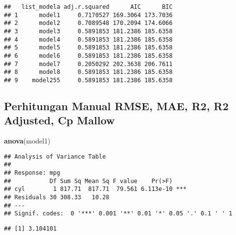 \documentclass[
]{article}
\newenvironment{Shaded}{\begin{snugshade}}{\end{snugshade}}
\newcommand{\DecValTok}[1]{\textcolor[rgb]{0.00,0.00,0.81}{#1}}
\newcommand{\FloatTok}[1]{\textcolor[rgb]{0.00,0.00,0.81}{#1}}
\newcommand{\FunctionTok}[1]{\textcolor[rgb]{0.13,0.29,0.53}{\textbf{#1}}}
\newcommand{\NormalTok}[1]{#1}
\newcommand{\OtherTok}[1]{\textcolor[rgb]{0.56,0.35,0.01}{#1}}
\newcommand{\SpecialCharTok}[1]{\textcolor[rgb]{0.81,0.36,0.00}{\textbf{#1}}}
\begin{document}
\begin{verbatim}
##   list_modela adj.r.squared      AIC      BIC
## 1      model1     0.7170527 169.3064 173.7036
## 2      model2     0.7089548 170.2094 174.6066
## 3      model3     0.5891853 181.2386 185.6358
## 4      model4     0.5891853 181.2386 185.6358
## 5      model5     0.5891853 181.2386 185.6358
## 6      model6     0.5891853 181.2386 185.6358
## 7      model7     0.2050292 202.3638 206.7611
## 8      model8     0.5891853 181.2386 185.6358
## 9    model255     0.5891853 181.2386 185.6358
\end{verbatim}

\subsection{Perhitungan Manual RMSE, MAE, R2, R2 Adjusted, Cp
Mallow}\label{perhitungan-manual-rmse-mae-r2-r2-adjusted-cp-mallow}

\begin{Shaded}
\begin{Highlighting}[]
\FunctionTok{anova}\NormalTok{(model1)}
\end{Highlighting}
\end{Shaded}

\begin{verbatim}
## Analysis of Variance Table
## 
## Response: mpg
##           Df Sum Sq Mean Sq F value    Pr(>F)    
## cyl        1 817.71  817.71  79.561 6.113e-10 ***
## Residuals 30 308.33   10.28                      
## ---
## Signif. codes:  0 '***' 0.001 '**' 0.01 '*' 0.05 '.' 0.1 ' ' 1
\end{verbatim}

\begin{Shaded}
\end{Shaded}

\begin{verbatim}
## [1] 3.104101
\end{verbatim}
\end{document}

